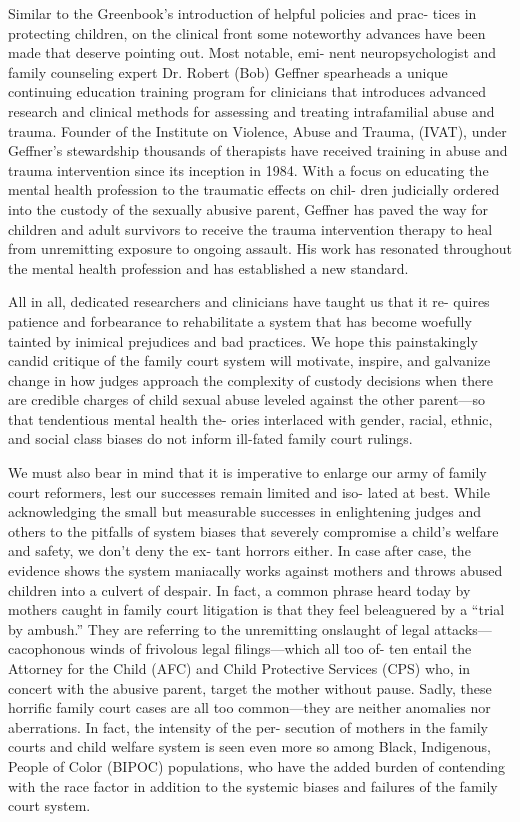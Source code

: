 Similar to the Greenbook’s introduction of helpful policies and prac-
tices in protecting children, on the clinical front some noteworthy
advances have been made that deserve pointing out. Most notable, emi-
nent neuropsychologist and family counseling expert Dr. Robert (Bob)
Geffner spearheads a unique continuing education training program
for clinicians that introduces advanced research and clinical methods
for assessing and treating intrafamilial abuse and trauma. Founder of
the Institute on Violence, Abuse and Trauma, (IVAT), under Geffner’s
stewardship thousands of therapists have received training in abuse
and trauma intervention since its inception in 1984. With a focus on
educating the mental health profession to the traumatic effects on chil-
dren judicially ordered into the custody of the sexually abusive parent,
Geffner has paved the way for children and adult survivors to receive
the trauma intervention therapy to heal from unremitting exposure to
ongoing assault. His work has resonated throughout the mental health
profession and has established a new standard. \pfl{}

All in all, dedicated researchers and clinicians have taught us that it re-
quires patience and forbearance to rehabilitate a system that has become
woefully tainted by inimical prejudices and bad practices. We hope this
painstakingly candid critique of the family court system will motivate,
inspire, and galvanize change in how judges approach the complexity of
custody decisions when there are credible charges of child sexual abuse
leveled against the other parent—so that tendentious mental health the-
ories interlaced with gender, racial, ethnic, and social class biases do not
inform ill-fated family court rulings. \pfl{}


We must also bear in mind that it is imperative to enlarge our army
of family court reformers, lest our successes remain limited and iso-
lated at best. While acknowledging the small but measurable successes
in enlightening judges and others to the pitfalls of system biases that
severely compromise a child’s welfare and safety, we don’t deny the ex-
tant horrors either. In case after case, the evidence shows the system
maniacally works against mothers and throws abused children into a
culvert of despair. In fact, a common phrase heard today by mothers
caught in family court litigation is that they feel beleaguered by a “trial
by ambush.” They are referring to the unremitting onslaught of legal
attacks—cacophonous winds of frivolous legal filings—which all too of-
ten entail the Attorney for the Child (AFC) and Child Protective Services
(CPS) who, in concert with the abusive parent, target the mother without
pause. Sadly, these horrific family court cases are all too common—they
are neither anomalies nor aberrations. In fact, the intensity of the per-
secution of mothers in the family courts and child welfare system is
seen even more so among Black, Indigenous, People of Color (BIPOC)
populations, who have the added burden of contending with the race
factor in addition to the systemic biases and failures of the family court
system. \pfl{}


